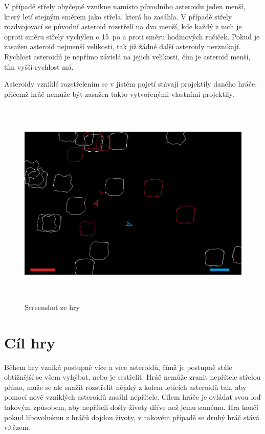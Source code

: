 \par
V případě střely obyčejné vznikne namísto původního asteroidu jeden menší, který letí stejným směrem jako střela, která ho zasáhla.
V případě střely rozdvojovací se původní asteroid rozstřelí na dva menší, kde každý z nich je oproti směru střely vychýlen o 15\textdegree\ po a proti směru hodinových ručiček.
Pokud je zasažen asteroid nejmenší velikosti, tak již žádné další asteroidy nevznikají. 
Rychlost asteroidů je nepřímo závislá na jejich velikosti, čím je asteroid menší, tím vyšší rychlost má.
\par
Asteroidy vzniklé rozstřelením se v jistém pojetí stávají projektily daného hráče, přičemž hráč nemůže být zasažen takto vytvořenými vlastními projektily.

\begin{figure}[p]

\includegraphics[width=150mm, height=100mm]{./Obrazky/UkazkaHry.png}
\caption{Screenshot ze hry}
\label{obr01:}
\end{figure}


\section{Cíl hry}
Během hry vzniká postupně více a více asteroidů, čímž je postupně stále obtížnější se všem vyhýbat, nebo je sestřelit.
Hráč nemůže zranit nepřítele střelou přímo, může se ale snažit rozstřelit nějaký z kolem letících asteroidů tak, aby pomocí nově vzniklých asteroidů zasáhl nepřítele.
Cílem hráče je ovládat svou loď takovým způsobem, aby nepříteli došly životy dříve než jemu samému. Hra končí pokud libovolnému z hráčů dojdou životy, v takovém případě se druhý hráč stává vítězem.

